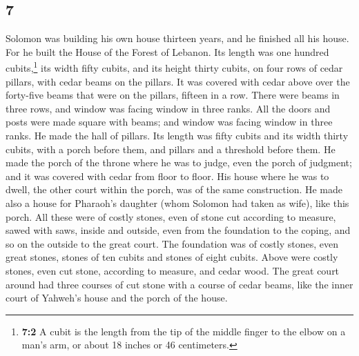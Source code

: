 \begin{paracol}{2}
\switchcolumn
\begin{otherlanguage}{english}

\hypertarget{section-13}{%
\section{7}\label{section-13}}

 Solomon was building his own house thirteen years, and he
finished all his house.  For he built the House of the
Forest of Lebanon. Its length was one hundred cubits,\footnote{\textbf{7:2}
  A cubit is the length from the tip of the middle finger to the elbow
  on a man's arm, or about 18 inches or 46 centimeters.} its width fifty
cubits, and its height thirty cubits, on four rows of cedar pillars,
with cedar beams on the pillars.  It was covered with
cedar above over the forty-five beams that were on the pillars, fifteen
in a row.  There were beams in three rows, and window was
facing window in three ranks.  All the doors and posts
were made square with beams; and window was facing window in three
ranks.  He made the hall of pillars. Its length was fifty
cubits and its width thirty cubits, with a porch before them, and
pillars and a threshold before them.  He made the porch of
the throne where he was to judge, even the porch of judgment; and it was
covered with cedar from floor to floor.  His house where
he was to dwell, the other court within the porch, was of the same
construction. He made also a house for Pharaoh's daughter (whom Solomon
had taken as wife), like this porch.  All these were of
costly stones, even of stone cut according to measure, sawed with saws,
inside and outside, even from the foundation to the coping, and so on
the outside to the great court.  The foundation was of
costly stones, even great stones, stones of ten cubits and stones of
eight cubits.  Above were costly stones, even cut stone,
according to measure, and cedar wood.  The great court
around had three courses of cut stone with a course of cedar beams, like
the inner court of Yahweh's house and the porch of the house.


\end{otherlanguage}
\end{paracol}
